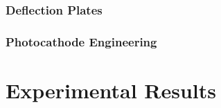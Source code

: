 \documentclass{uicthesi}
\begin{document}
\subsection{Deflection Plates}

\subsection{Photocathode Engineering}

\chapter{Experimental Results}

 


\end{document}
